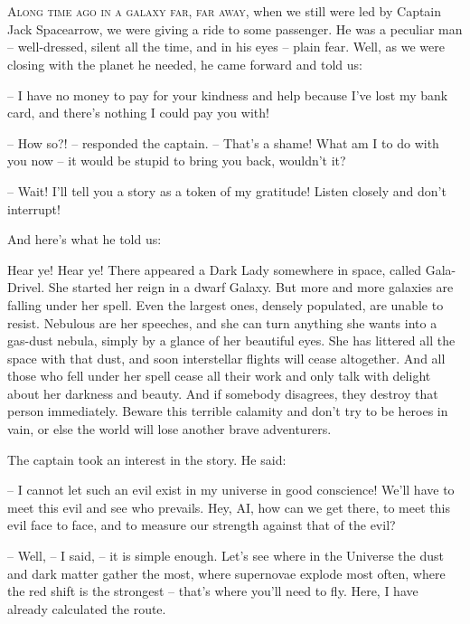 \documentclass[ebook,twoside,final,openright]{memoir}
\begin{document}
\chapter{}
\par
\lettrine{A}{long time ago in a galaxy far, far away,} when we still were led by Captain Jack Spacearrow, we were giving a ride to some passenger. He was a peculiar man – well-dressed, silent all the time, and in his eyes – plain fear. Well, as we were closing with the planet he needed, he came forward and told us: \par
\par
– I have no money to pay for your kindness and help because I’ve lost my bank card, and there’s nothing I could pay you with!\par
– How so?! – responded the captain. – That's a shame! What am I to do with you now – it would be stupid to bring you back, wouldn’t it? \par
– Wait! I'll tell you a story as a token of my gratitude! Listen closely and don’t interrupt! \par
 And here’s what he told us:\par
\par
Hear ye! Hear ye! There appeared a Dark Lady somewhere in space, called Gala-Drivel. She started her reign in a dwarf Galaxy. But more and more galaxies are falling under her spell. Even the largest ones, densely populated, are unable to resist. Nebulous are her speeches, and she can turn anything she wants into a gas-dust nebula, simply by a glance of her beautiful eyes. She has littered all the space with that dust, and soon interstellar flights will cease altogether. And all those who fell under her spell cease all their work and only talk with delight about her darkness and beauty. And if somebody disagrees, they destroy that person immediately. Beware this terrible calamity and don’t try to be heroes in vain, or else the world will lose another brave adventurers.\par
\par
The captain took an interest in the story. He said:\par
– I cannot let such an evil exist in my universe in good conscience! We'll have to meet this evil and see who prevails. Hey, AI, how can we get there, to meet this evil face to face, and to measure our strength against that of the evil?\par
– Well, – I said, – it is simple enough. Let's see where in the Universe the dust and dark matter gather the most, where supernovae explode most often, where the red shift is the strongest – that’s where you’ll need to fly. Here, I have already calculated the route.\par
\end{document}
